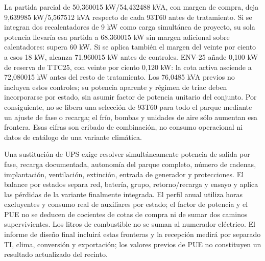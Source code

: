 La partida parcial de 50,360015 kW/54,432488 kVA, con margen de compra, deja 9,639985 kW/5,567512 kVA respecto de cada 93T60 antes de tratamiento. Si se integran dos recalentadores de 9 kW como carga simultánea de proyecto, su sola potencia llevaría esa partida a 68,360015 kW sin margen adicional sobre calentadores: supera 60 kW. Si se aplica también el margen del veinte por ciento a esos 18 kW, alcanza 71,960015 kW antes de controles. ENV-25 añade 0,100 kW de reserva de TTC25, con veinte por ciento 0,120 kW: la cota activa asciende a 72,080015 kW antes del resto de tratamiento. Los 76,0485 kVA previos no incluyen estos controles; su potencia aparente y régimen de triac deben incorporarse por estado, sin asumir factor de potencia unitario del conjunto. Por consiguiente, no se libera una selección de 93T60 para todo el parque mediante un ajuste de fase o recarga; el frío, bombas y unidades de aire sólo aumentan esa frontera. Esas cifras son cribado de combinación, no consumo operacional ni datos de catálogo de una variante climática.

Una sustitución de UPS exige resolver simultáneamente potencia de salida por fase, recarga documentada, autonomía del parque completo, número de cadenas, implantación, ventilación, extinción, entrada de generador y protecciones. El balance por estados separa red, batería, grupo, retorno/recarga y ensayo y aplica las pérdidas de la variante finalmente integrada. El perfil anual utiliza horas excluyentes y consumo real de auxiliares por estado; el factor de potencia y el PUE no se deducen de cocientes de cotas de compra ni de sumar dos caminos supervivientes. Los litros de combustible no se suman al numerador eléctrico. El informe de diseño final incluirá estas fronteras y la recepción medirá por separado TI, clima, conversión y exportación; los valores previos de PUE no constituyen un resultado actualizado del recinto.
